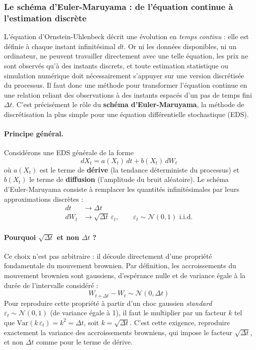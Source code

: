\documentclass{article}
\begin{document}
\subsubsection*{Le schéma d'Euler-Maruyama : de l'équation continue à l'estimation discrète}
L'équation d'Ornstein-Uhlenbeck décrit une évolution en \emph{temps continu} : elle est définie à chaque instant infinitésimal $dt$. Or ni les données disponibles, ni un ordinateur, ne peuvent travailler directement avec une telle équation, les prix ne sont observés qu'à des instants discrets, et toute estimation statistique ou simulation numérique doit nécessairement s'appuyer sur une version discrétisée du processus. Il faut donc une méthode pour transformer l'équation continue en une relation reliant des observations à des instants espacés d'un pas de temps fini $\Delta t$. C'est précisément le rôle du \textbf{schéma d'Euler-Maruyama}, la méthode de discrétisation la plus simple pour une équation différentielle stochastique (EDS).
\paragraph{Principe général.} Considérons une EDS générale de la forme
\begin{equation}
dX_t = a(X_t)\,dt + b(X_t)\,dW_t
\end{equation}
où $a(X_t)$ est le terme de \textbf{dérive} (la tendance déterministe du processus) et $b(X_t)$ le terme de \textbf{diffusion} (l'amplitude du bruit aléatoire). Le schéma d'Euler-Maruyama consiste à remplacer les quantités infinitésimales par leurs approximations discrètes :
\begin{align}
dt &\longrightarrow \Delta t \\
dW_t &\longrightarrow \sqrt{\Delta t}\, \varepsilon_t, \qquad \varepsilon_t \sim \mathcal{N}(0,1) \text{ i.i.d.}
\end{align}
\paragraph{Pourquoi $\sqrt{\Delta t}$ et non $\Delta t$ ?} Ce choix n'est pas arbitraire : il découle directement d'une propriété fondamentale du mouvement brownien. Par définition, les accroissements du mouvement brownien sont gaussiens, d'espérance nulle et de variance égale à la durée de l'intervalle considéré :
\begin{equation}
W_{t+\Delta t} - W_t \sim \mathcal{N}(0, \Delta t)
\end{equation}
Pour reproduire cette propriété à partir d'un choc gaussien \emph{standard} $\varepsilon_t \sim \mathcal{N}(0,1)$ (de variance égale à 1), il faut le multiplier par un facteur $k$ tel que $\text{Var}(k\,\varepsilon_t) = k^2 = \Delta t$, soit $k = \sqrt{\Delta t}$. C'est cette exigence, reproduire exactement la variance des accroissements browniens, qui impose le facteur $\sqrt{\Delta t}$, et non $\Delta t$ comme pour le terme de dérive.
\end{document}
